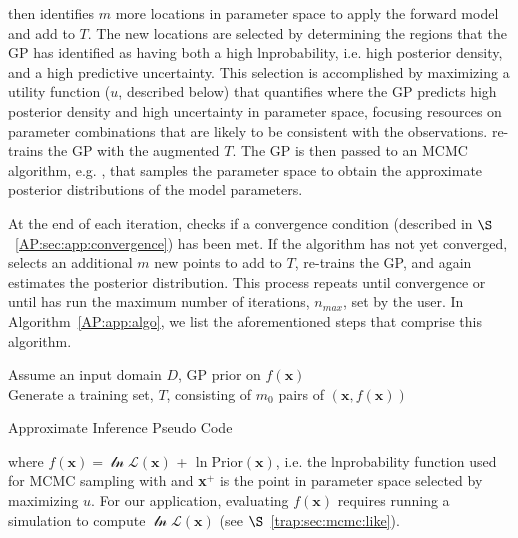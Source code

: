 \approxposterior then identifies $m$ more locations in parameter space to apply the forward model and add to $T$. The new locations are selected by determining the regions that the GP has identified as having both a high lnprobability, i.e. high posterior density, and a high predictive uncertainty. This selection is accomplished by maximizing a utility function ($u$, described below) that quantifies where the GP predicts high posterior density and high uncertainty in parameter space, focusing resources on parameter combinations that are likely to be consistent with the observations. \approxposterior re-trains the GP with the augmented $T$. The GP is then passed to an MCMC algorithm, e.g. \emcee, that samples the parameter space to obtain the approximate posterior distributions of the model parameters.

At the end of each iteration, \approxposterior checks if a convergence condition (described in $\S$~\ref{AP:sec:app:convergence}) has been met. If the algorithm  has not yet converged, \approxposterior selects an additional $m$ new points to add to $T$, re-trains the GP, and again estimates the posterior distribution. This process repeats until convergence or until \approxposterior has run the maximum number of iterations, $n_{max}$, set by the user. In Algorithm~\ref{AP:app:algo}, we list the aforementioned steps that comprise this algorithm.

\begin{algorithm} 
\SetAlgoLined
 Assume an input domain $D$, GP prior on $f(\textbf{x})$ \\
 Generate a training set, $T$, consisting of $m_0$ pairs of $(\textbf{x}, f(\textbf{x}))$ \\
\caption{\approxposterior Approximate Inference Pseudo Code  \label{AP:app:algo}}
\end{algorithm}
where $f(\textbf{x}) = \mathcal{\ln L}(\textbf{x})$ + $\ln \mathrm{Prior}(\textbf{x})$, i.e. the lnprobability function used for MCMC sampling with \emcee and \textbf{x}$^+$ is the point in parameter space selected by maximizing $u$. For our application, evaluating $f(\textbf{x})$ requires running a \vplanet simulation to compute $\mathcal{\ln L}(\textbf{x})$ (see $\S$~\ref{trap:sec:mcmc:like}).

